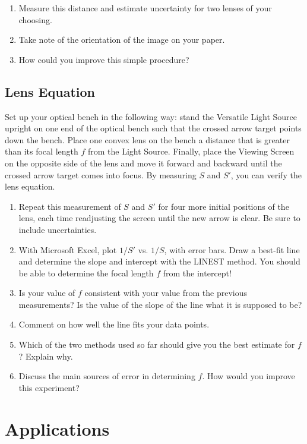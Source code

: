 \begin{enumerate}
\item Measure this distance and estimate uncertainty for two lenses of your choosing.
\item Take note of the orientation of the image on your paper.
\item How could you improve this simple procedure?
\end{enumerate}

\subsection{Lens Equation}
\label{sec:lensequation}

Set up your optical bench in the following way: stand the Versatile Light Source upright on one end of the optical bench such that the crossed arrow target points down the bench. Place one convex lens on the bench a distance that is greater than its focal length $f$ from the Light Source.  Finally, place the Viewing Screen on the opposite side of the lens and move it forward and backward until the crossed arrow target comes into focus. By measuring $S$ and $S'$, you can verify the lens equation.
\begin{enumerate}
\item Repeat this measurement of $S$ and $S'$ for four more initial positions of the lens, each time readjusting the screen until the new arrow is clear. Be sure to include uncertainties.
\item With Microsoft Excel, plot $1/S'$ vs. $1/S$, with error bars. Draw a best-fit line and determine the slope and intercept with the LINEST method. You should be able to determine the focal length $f$ from the intercept!
\item Is your value of $f$ consistent with your value from the previous measurements? Is the value of the slope of the line what it is supposed to be?
\item Comment on how well the line fits your data points.
\item Which of the two methods used so far should give you the best estimate for $f$? Explain why.
\item Discuss the main sources of error in determining $f$. How would you improve this experiment?
\end{enumerate}

\section{Applications}

